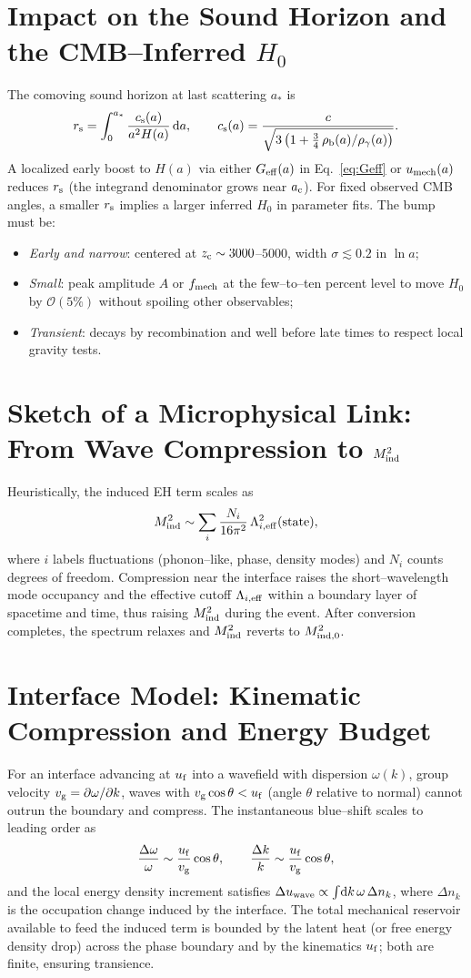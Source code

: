 \documentclass[11pt,a4paper]{article}
\newcommand{\rs}{r_{\rm s}}
\newcommand{\Geff}{G_{\rm eff}}
\newcommand{\ac}{a_{\rm c}}
\newcommand{\zc}{z_{\rm c}}
\newcommand{\dx}{\mathrm{d}}
\newcommand{\be}{\begin{equation}}
\newcommand{\ee}{\end{equation}}
\begin{document}
\section{Impact on the Sound Horizon and the CMB--Inferred $H_0$}
The comoving sound horizon at last scattering $a_\ast$ is
\be
\rs = \int_0^{a_\ast} \frac{c_{\rm s}(a)}{a^2 H(a)}\,\dx a,
\qquad
c_{\rm s}(a) = \frac{c}{\sqrt{3\left(1 + \tfrac{3}{4}\,\rho_{\rm b}(a)/\rho_{\gamma}(a)\right)}}.
\ee
A localized early boost to $H(a)$ via either $\Geff(a)$ in Eq.~\eqref{eq:Geff} or $u_{\rm mech}(a)$ reduces $\rs$ (the integrand denominator grows near $\ac$). For fixed observed CMB angles, a smaller $\rs$ implies a larger inferred $H_0$ in parameter fits. The bump must be:
\begin{itemize}
    \item \emph{Early and narrow}: centered at $\zc\sim 3000$--$5000$, width $\sigma\lesssim 0.2$ in $\ln a$;
    \item \emph{Small}: peak amplitude $A$ or $f_{\rm mech}$ at the few--to--ten percent level to move $H_0$ by $\mathcal{O}(5\%)$ without spoiling other observables;
    \item \emph{Transient}: decays by recombination and well before late times to respect local gravity tests.
\end{itemize}

\section{Sketch of a Microphysical Link: From Wave Compression to $M_{\rm ind}^2$}
Heuristically, the induced EH term scales as
\be
M_{\rm ind}^2 \sim \sum_i \frac{N_i}{16\pi^2}\,\Lambda_{i,\rm eff}^2(\text{state}),
\ee
where $i$ labels fluctuations (phonon--like, phase, density modes) and $N_i$ counts degrees of freedom. Compression near the interface raises the short--wavelength mode occupancy and the effective cutoff $\Lambda_{i,\rm eff}$ within a boundary layer of spacetime and time, thus raising $M_{\rm ind}^2$ during the event. After conversion completes, the spectrum relaxes and $M_{\rm ind}^2$ reverts to $M_{\rm ind,0}^2$.

\section{Interface Model: Kinematic Compression and Energy Budget}
For an interface advancing at $u_{\rm f}$ into a wavefield with dispersion $\omega(k)$, group velocity $v_{\rm g}=\partial\omega/\partial k$, waves with $v_{\rm g}\cos\theta < u_{\rm f}$ (angle $\theta$ relative to normal) cannot outrun the boundary and compress. The instantaneous blue--shift scales to leading order as
\be
\frac{\Delta \omega}{\omega} \sim \frac{u_{\rm f}}{v_{\rm g}}\cos\theta,
\qquad
\frac{\Delta k}{k} \sim \frac{u_{\rm f}}{v_{\rm g}}\cos\theta,
\ee
and the local energy density increment satisfies $\Delta u_{\rm wave} \propto \int\!\dx k\, \omega\,\Delta n_k$, where $\Delta n_k$ is the occupation change induced by the interface. The total mechanical reservoir available to feed the induced term is bounded by the latent heat (or free energy density drop) across the phase boundary and by the kinematics $u_{\rm f}$; both are finite, ensuring transience.
\end{document}
